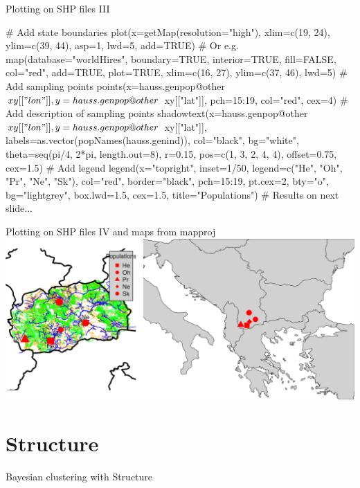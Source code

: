\documentclass[compress, ucs, xelatex, 11pt, xcolor=svgnames,
  hyperref={
    bookmarks=true,
    unicode=true,
    colorlinks=true,
    pdftitle={Molecular data in R},
    plainpages=false,
    pdfauthor={Vojtech Zeisek},
    pdfsubject={Course about phylogeny and evolution in R},
    pdfcreator={XeLaTeX},
    pdfkeywords={R, evolution, phylogeny, molecular data},
    linkcolor=Tomato,
    anchorcolor=SaddleBrown,
    citecolor=Goldenrod,
    filecolor=DarkMagenta,
    menucolor=Sienna,
    urlcolor=DarkTurquoise,
    pdftex},
  url={hyphens, lowtilde} %
  ]{beamer}
\begin{document}
\begin{frame}[fragile]{Plotting on SHP files III}
  \begin{spluscode}
    # Add state boundaries
    plot(x=getMap(resolution="high"), xlim=c(19, 24), ylim=c(39, 44), asp=1,
      lwd=5, add=TRUE) # Or e.g.
    map(database="worldHires", boundary=TRUE, interior=TRUE, fill=FALSE,
      col="red", add=TRUE, plot=TRUE, xlim=c(16, 27), ylim=c(37, 46), lwd=5)
    # Add sampling points
    points(x=hauss.genpop@other$xy[["lon"]], y=hauss.genpop@other$
      xy[["lat"]], pch=15:19, col="red", cex=4)
    # Add description of sampling points
    shadowtext(x=hauss.genpop@other$xy[["lon"]], y=hauss.genpop@other$
      xy[["lat"]], labels=as.vector(popNames(hauss.genind)), col="black",
      bg="white", theta=seq(pi/4, 2*pi, length.out=8), r=0.15,
      pos=c(1, 3, 2, 4, 4), offset=0.75, cex=1.5)
    # Add legend
    legend(x="topright", inset=1/50, legend=c("He", "Oh", "Pr", "Ne",
      "Sk"), col="red", border="black", pch=15:19, pt.cex=2, bty="o",
      bg="lightgrey", box.lwd=1.5, cex=1.5, title="Populations")
    # Results on next slide...
  \end{spluscode}
\end{frame}

\begin{frame}{Plotting on SHP files IV and maps from mapproj}
  \includegraphics[width=\textwidth]{mapy.png}
\end{frame}

\section{Structure}

\begin{frame}{Bayesian clustering with Structure}
  \tableofcontents[currentsection, sectionstyle=show/hide, hideothersubsections]
\end{frame}
\end{document}
